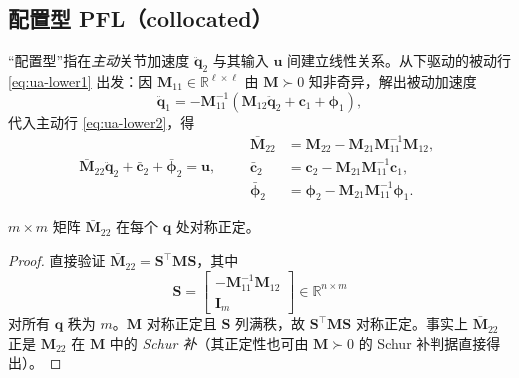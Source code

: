\subsection{配置型 PFL（collocated）}\label{sec:ua-collocated}

“配置型”指在\emph{主动}关节加速度 $\ddot{\mathbf{q}}_2$ 与其输入 $\mathbf{u}$ 间建立线性关系。从下驱动的被动行 \cref{eq:ua-lower1} 出发：因 $\mathbf{M}_{11}\in\mathbb{R}^{\ell\times\ell}$ 由 $\mathbf{M}\succ0$ 知非奇异，解出被动加速度
\begin{equation}\label{eq:ua-q1ddot}
  \ddot{\mathbf{q}}_1=-\mathbf{M}_{11}^{-1}(\mathbf{M}_{12}\ddot{\mathbf{q}}_2+\mathbf{c}_1+\boldsymbol{\phi}_1),
\end{equation}
代入主动行 \cref{eq:ua-lower2}，得
\begin{equation}\label{eq:ua-coll-reduced}
  \bar{\mathbf{M}}_{22}\ddot{\mathbf{q}}_2+\bar{\mathbf{c}}_2+\bar{\boldsymbol{\phi}}_2=\mathbf{u},\qquad
  \begin{aligned}
    \bar{\mathbf{M}}_{22}&=\mathbf{M}_{22}-\mathbf{M}_{21}\mathbf{M}_{11}^{-1}\mathbf{M}_{12},\\
    \bar{\mathbf{c}}_2&=\mathbf{c}_2-\mathbf{M}_{21}\mathbf{M}_{11}^{-1}\mathbf{c}_1,\\
    \bar{\boldsymbol{\phi}}_2&=\boldsymbol{\phi}_2-\mathbf{M}_{21}\mathbf{M}_{11}^{-1}\boldsymbol{\phi}_1.
  \end{aligned}
\end{equation}

\begin{proposition}\label{thm:ua-Mbar-spd}
$m\times m$ 矩阵 $\bar{\mathbf{M}}_{22}$ 在每个 $\mathbf{q}$ 处对称正定。
\end{proposition}
\begin{proof}
直接验证 $\bar{\mathbf{M}}_{22}=\mathbf{S}^\top\mathbf{M}\mathbf{S}$，其中
\begin{equation}\label{eq:ua-Smat}
  \mathbf{S}=\begin{bmatrix}-\mathbf{M}_{11}^{-1}\mathbf{M}_{12}\\\mathbf{I}_m\end{bmatrix}\in\mathbb{R}^{n\times m}
\end{equation}
对所有 $\mathbf{q}$ 秩为 $m$。$\mathbf{M}$ 对称正定且 $\mathbf{S}$ 列满秩，故 $\mathbf{S}^\top\mathbf{M}\mathbf{S}$ 对称正定。事实上 $\bar{\mathbf{M}}_{22}$ 正是 $\mathbf{M}_{22}$ 在 $\mathbf{M}$ 中的 \emph{Schur 补}（其正定性也可由 $\mathbf{M}\succ0$ 的 Schur 补判据直接得出）。
\end{proof}

